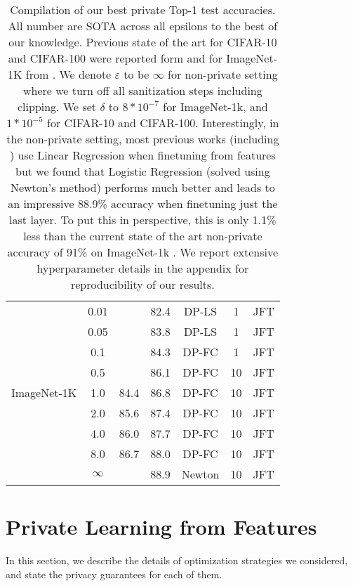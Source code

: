 \documentclass[letterpaper]{article} \usepackage{fullpage}
\renewcommand{\epsilon}{\varepsilon}
\begin{document}
\begin{table}[]
\begin{tabular}{lcccccc}
\multirow{9}{*}{ImageNet-1K} 
&         0.01&         & 82.4 & DP-LS & 1 & JFT \\
&         0.05&         & 83.8 & DP-LS & 1 & JFT \\
&         0.1 &        & 84.3 & DP-FC & 1 & JFT \\
&         0.5 &        & 86.1 & DP-FC & 10 & JFT \\
&        1.0  &   84.4    & 86.8 & DP-FC & 10 & JFT\\
&       2.0   &  85.6    & 87.4 & DP-FC & 10 & JFT\\
&      4.0    &  86.0   & 87.7 & DP-FC & 10 & JFT\\
&     8.0     &  86.7  & 88.0 & DP-FC & 10 & JFT\\
&    $\infty$ &   & 88.9 & Newton & 10 & JFT\\

\bottomrule
    \end{tabular}
        \caption{Compilation of our best private Top-1 test accuracies. All number are SOTA across all epsilons to the best of our knowledge. Previous state of the art for CIFAR-10 and CIFAR-100 were reported form \cite{bu2022scalable_oldsota} and for ImageNet-1K from \cite{dm_transfer_2022}. We denote $\epsilon$ to be $\infty$ for non-private setting where we turn off all sanitization steps including clipping. We set $\delta$ to $8 * 10^{-7}$ for ImageNet-1k, and $1 * 10^{-5}$ for CIFAR-10 and CIFAR-100. Interestingly, in the non-private setting, most previous works (including \cite{zhai2021scaling}) use Linear Regression when finetuning from features but we found that Logistic Regression (solved using Newton's method) performs much better and leads to an impressive 88.9\% accuracy when finetuning just the last layer. To put this in perspective, this is only 1.1\% less than the current state of the art non-private accuracy of 91\% on ImageNet-1k \citep{yu2022coca}. We report extensive hyperparameter details in the appendix for reproducibility of our results.}
            \label{tab:method_comparison}
\end{table}







    



\section{Private Learning from Features}
\label{sec:method}
In this section, we describe the details of optimization strategies we considered, and state the privacy guarantees for each of them.
\end{document}
